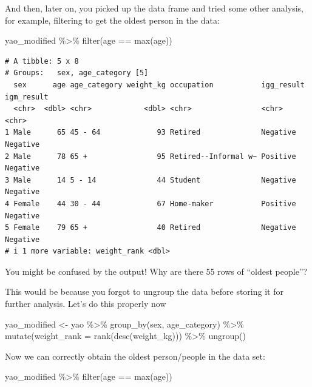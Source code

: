 \documentclass[
  letterpaper,
  DIV=11,
  numbers=noendperiod]{scrreprt}
\newenvironment{Shaded}{\begin{snugshade}}{\end{snugshade}}
\newcommand{\AttributeTok}[1]{\textcolor[rgb]{0.40,0.45,0.13}{#1}}
\newcommand{\FunctionTok}[1]{\textcolor[rgb]{0.28,0.35,0.67}{#1}}
\newcommand{\NormalTok}[1]{\textcolor[rgb]{0.00,0.23,0.31}{#1}}
\newcommand{\OtherTok}[1]{\textcolor[rgb]{0.00,0.23,0.31}{#1}}
\newcommand{\SpecialCharTok}[1]{\textcolor[rgb]{0.37,0.37,0.37}{#1}}
\begin{document}
\begin{tcolorbox}
And then, later on, you picked up the data frame and tried some other
analysis, for example, filtering to get the oldest person in the data:

\begin{Shaded}
\begin{Highlighting}[]
\NormalTok{yao\_modified }\SpecialCharTok{\%\textgreater{}\%} 
  \FunctionTok{filter}\NormalTok{(age }\SpecialCharTok{==} \FunctionTok{max}\NormalTok{(age))}
\end{Highlighting}
\end{Shaded}

\begin{verbatim}
# A tibble: 5 x 8
# Groups:   sex, age_category [5]
  sex      age age_category weight_kg occupation           igg_result igm_result
  <chr>  <dbl> <chr>            <dbl> <chr>                <chr>      <chr>     
1 Male      65 45 - 64             93 Retired              Negative   Negative  
2 Male      78 65 +                95 Retired--Informal w~ Positive   Negative  
3 Male      14 5 - 14              44 Student              Negative   Negative  
4 Female    44 30 - 44             67 Home-maker           Positive   Negative  
5 Female    79 65 +                40 Retired              Negative   Negative  
# i 1 more variable: weight_rank <dbl>
\end{verbatim}

You might be confused by the output! Why are there 55 rows of ``oldest
people''?

This would be because you forgot to ungroup the data before storing it
for further analysis. Let's do this properly now

\begin{Shaded}
\begin{Highlighting}[]
\NormalTok{yao\_modified }\OtherTok{\textless{}{-}} 
\NormalTok{  yao }\SpecialCharTok{\%\textgreater{}\%} 
  \FunctionTok{group\_by}\NormalTok{(sex, age\_category) }\SpecialCharTok{\%\textgreater{}\%} 
  \FunctionTok{mutate}\NormalTok{(}\AttributeTok{weight\_rank =} \FunctionTok{rank}\NormalTok{(}\FunctionTok{desc}\NormalTok{(weight\_kg))) }\SpecialCharTok{\%\textgreater{}\%} 
  \FunctionTok{ungroup}\NormalTok{()}
\end{Highlighting}
\end{Shaded}

Now we can correctly obtain the oldest person/people in the data set:

\begin{Shaded}
\begin{Highlighting}[]
\NormalTok{yao\_modified }\SpecialCharTok{\%\textgreater{}\%} 
  \FunctionTok{filter}\NormalTok{(age }\SpecialCharTok{==} \FunctionTok{max}\NormalTok{(age))}
\end{Highlighting}
\end{Shaded}


\end{tcolorbox}
\end{document}
